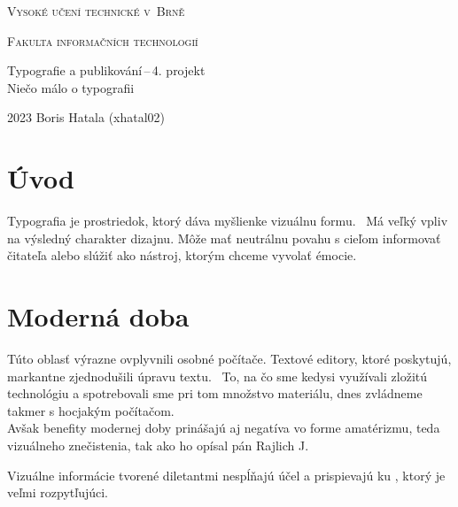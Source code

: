 \documentclass[11pt, a4paper]{article}
\begin{document}
\begin{titlepage}
\thispagestyle{empty}

    \begin{center}

        {\Huge \textsc{Vysoké učení technické v~Brně \\[0.5em]}}

        {\huge \textsc{Fakulta informačních technologií}}


        {\LARGE Typografie a publikování\,--\,4. projekt \\[0.4em] 
         Niečo málo o typografii}


    \end{center}
{\Large 2023 \hfill Boris Hatala (xhatal02)}

\end{titlepage}

\section*{Úvod}
Typografia je prostriedok, ktorý dáva myšlienke vizuálnu formu.~\cite{ambrose2005basics} 
Má veľký vpliv na výsledný charakter dizajnu.
Môže mať neutrálnu povahu s cieľom informovať čitateľa alebo slúžiť ako nástroj, 
ktorým chceme vyvolať émocie.

\section*{Moderná doba}
Túto oblasť výrazne ovplyvnili osobné počítače.
Textové editory, ktoré poskytujú, markantne zjednodušili úpravu textu.~\cite{rybička1995latex}
To, na čo sme kedysi využívali zložitú technológiu a spotrebovali
sme pri tom množstvo materiálu, dnes zvládneme takmer s hocjakým počítačom.\\
Avšak benefity modernej doby prinášajú aj negatíva vo forme amatérizmu, teda vizuálneho
znečistenia, tak ako ho opísal pán Rajlich J.~\cite{ralich1998typografie}
\begin{quote} 
\end{quote}
Vizuálne informácie tvorené diletantmi nespĺňajú 
účel a prispievajú ku ,
ktorý je veľmi rozpytľujúci.
\end{document}
